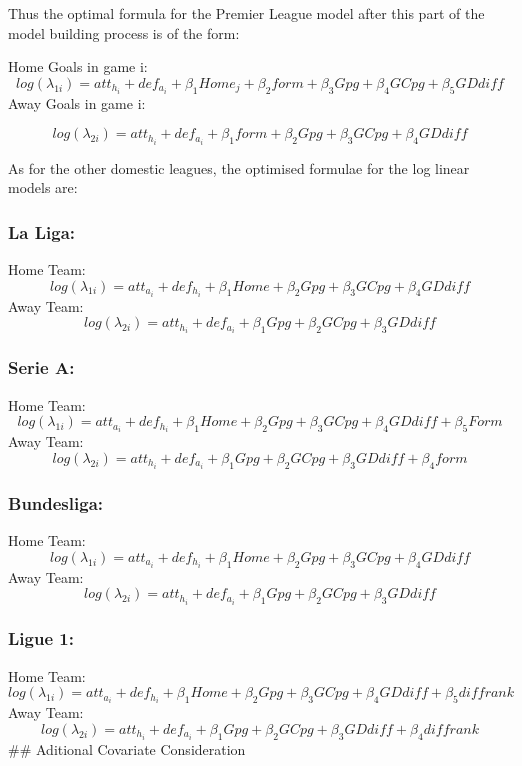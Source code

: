 \documentclass[
]{article}
\begin{document}
Thus the optimal formula for the Premier League model after this part of
the model building process is of the form:

Home Goals in game i:
\[log(\lambda_{1i}) =  att_{h_i} + def_{a_i} + \beta_1 Home_j + \beta_2 form + \beta_3 Gpg + \beta_4 GCpg +  \beta_5GDdiff\]
Away Goals in game i:

\[log(\lambda_{2i}) = att_{h_i} + def_{a_i} + \beta_1 form + \beta_2 Gpg + \beta_3 GCpg +  \beta_4 GDdiff\]

As for the other domestic leagues, the optimised formulae for the log
linear models are:

\hypertarget{la-liga}{%
\subsubsection{La Liga:}\label{la-liga}}

Home Team:
\[log(\lambda_{1i}) =   att_{a_i} + def_{h_i} +  \beta_1 Home + \beta_2 Gpg + \beta_3 GCpg + \beta_4 GDdiff\]
Away Team:
\[log(\lambda_{2i}) =   att_{h_i} + def_{a_i} + \beta_1 Gpg + \beta_2 GCpg +  \beta_3 GDdiff\]

\hypertarget{serie-a}{%
\subsubsection{Serie A:}\label{serie-a}}

Home Team:
\[log(\lambda_{1i}) =   att_{a_i} + def_{h_i} +  \beta_1 Home + \beta_2 Gpg + \beta_3 GCpg + \beta_4 GDdiff + \beta_5 Form\]
Away Team:
\[log(\lambda_{2i}) =   att_{h_i} + def_{a_i} + \beta_1 Gpg + \beta_2 GCpg +  \beta_3 GDdiff + \beta_4 form\]

\hypertarget{bundesliga}{%
\subsubsection{Bundesliga:}\label{bundesliga}}

Home Team:
\[log(\lambda_{1i}) =   att_{a_i} + def_{h_i} +  \beta_1 Home + \beta_2 Gpg + \beta_3 GCpg + \beta_4 GDdiff\]
Away Team:
\[log(\lambda_{2i}) =   att_{h_i} + def_{a_i} + \beta_1 Gpg + \beta_2 GCpg +  \beta_3 GDdiff\]

\hypertarget{ligue-1}{%
\subsubsection{Ligue 1:}\label{ligue-1}}

Home Team:
\[log(\lambda_{1i}) =   att_{a_i} + def_{h_i} +  \beta_1 Home + \beta_2 Gpg + \beta_3 GCpg + \beta_4 GDdiff + \beta_5 diffrank\]
Away Team:
\[log(\lambda_{2i}) =   att_{h_i} + def_{a_i} + \beta_1 Gpg + \beta_2 GCpg +  \beta_3 GDdiff + \beta_4 diffrank\]
\#\# Aditional Covariate Consideration
\end{document}

